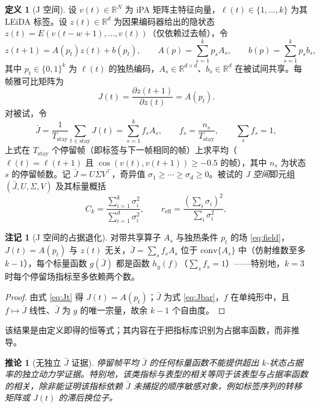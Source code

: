 \documentclass[11pt]{ctexart}
\newtheorem{corollary}{推论}
\theoremstyle{definition}
\newtheorem{definition}{定义}
\newtheorem{remark}{注记}
\newcommand{\R}{\mathbb{R}}
\begin{document}
\begin{definition}[J 空间]
设 $v(t)\in\R^N$ 为 iPA 矩阵主特征向量，$\ell(t)\in\{1,\dots,k\}$ 为其 LEiDA 标签。设 $z(t)\in\R^d$ 为因果编码器给出的隐状态 $z(t)=E(v(t-w+1),\dots,v(t))$（仅依赖过去帧），令
\begin{equation}
z(t+1)=A(p_t)z(t)+b(p_t),
\qquad
A(p)=\sum_{s=1}^{k}p_sA_s,
\qquad
b(p)=\sum_{s=1}^{k}p_sb_s,
\label{eq:field}
\end{equation}
其中 $p_t\in\{0,1\}^k$ 为 $\ell(t)$ 的独热编码，$A_s\in\R^{d\times d}$、$b_s\in\R^d$ 在被试间共享。每帧雅可比矩阵为
\begin{equation}
J(t)=\frac{\partial z(t+1)}{\partial z(t)}=A(p_t).
\label{eq:Jt}
\end{equation}
对被试，令
\begin{equation}
\bar J=\frac1{T_{\mathrm{stay}}}\sum_{t\in\mathrm{stay}}J(t)
=\sum_{s=1}^{k}f_sA_s,
\qquad
f_s=\frac{n_s}{T_{\mathrm{stay}}},
\qquad
\sum_s f_s=1,
\label{eq:Jbar}
\end{equation}
上式在 $T_{\mathrm{stay}}$ 个停留帧（即标签与下一帧相同的帧）上求平均（$\ell(t)=\ell(t+1)$ 且 $\cos(v(t),v(t+1))\ge-0.5$ 的帧），其中 $n_s$ 为状态 $s$ 的停留帧数。记 $\bar J=U\Sigma V^{\top}$，奇异值 $\sigma_1\ge\cdots\ge\sigma_d\ge0$。被试的 \emph{J 空间}即元组 $(\bar J,U,\Sigma,V)$ 及其标量概括
\begin{equation}
C_k=\frac{\sum_{i=1}^{k}\sigma_i^2}{\sum_{i=1}^{d}\sigma_i^2},
\qquad
r_{\mathrm{eff}}=\frac{(\sum_i\sigma_i)^2}{\sum_i\sigma_i^2},
\end{equation}
\end{definition}

\begin{remark}[J 空间的占据退化]
\label{thm:occupancy}
对带共享算子 $A_s$ 与独热条件 $p_t$ 的场 \eqref{eq:field}，$J(t)=A(p_t)$ 与 $z(t)$ 无关，$\bar J=\sum_s f_s A_s$ 位于 $\mathrm{conv}\{A_s\}$ 中（仿射维数至多 $k-1$），每个标量函数 $g(\bar J)$ 都是函数 $h_g(f)$（$\sum_s f_s=1$）——特别地，$k=3$ 时每个停留场指标至多依赖两个数。
\end{remark}

\begin{proof}
由式 \eqref{eq:Jt} 得 $J(t)=A(p_t)$；$\bar J$ 为式 \eqref{eq:Jbar}，$f$ 在单纯形中，且 $f\mapsto\bar J$ 线性、$\bar J$ 为 $g$ 的唯一宗量，故余 $k-1$ 个自由度。
\end{proof}

该结果是由定义即得的恒等式；其内容在于把指标库识别为占据率函数，而非推导。

\begin{corollary}[无独立 $\bar J$ 证据]
\label{cor:noindependent}
停留帧平均 $\bar J$ 的任何标量函数不能提供超出 $k$-状态占据率的独立动力学证据。特别地，该类指标与表型的相关等同于该表型与占据率函数的相关，除非能证明该指标依赖 $\bar J$ 未捕捉的顺序敏感对象，例如标签序列的转移矩阵或 $J(t)$ 的滞后换位子。
\end{corollary}
\end{document}

